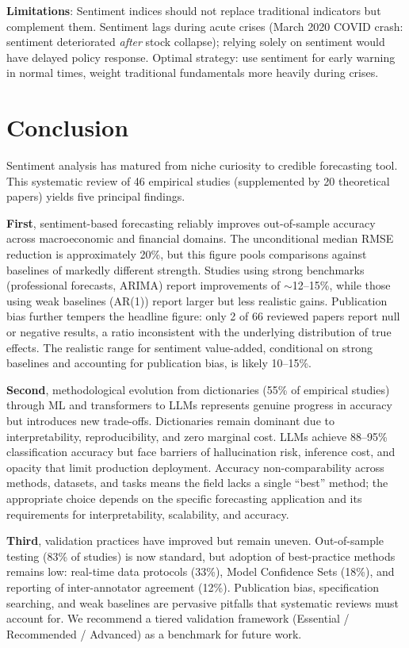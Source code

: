 \documentclass[11pt,twocolumn]{article}
\begin{document}
\textbf{Limitations}: Sentiment indices should not replace traditional indicators but complement them. Sentiment lags during acute crises (March 2020 COVID crash: sentiment deteriorated \emph{after} stock collapse); relying solely on sentiment would have delayed policy response. Optimal strategy: use sentiment for early warning in normal times, weight traditional fundamentals more heavily during crises.

\section{Conclusion}

Sentiment analysis has matured from niche curiosity to credible forecasting tool. This systematic review of 46 empirical studies (supplemented by 20 theoretical papers) yields five principal findings.

\textbf{First}, sentiment-based forecasting reliably improves out-of-sample accuracy across macroeconomic and financial domains. The unconditional median RMSE reduction is approximately 20\%, but this figure pools comparisons against baselines of markedly different strength. Studies using strong benchmarks (professional forecasts, ARIMA) report improvements of $\sim$12--15\%, while those using weak baselines (AR(1)) report larger but less realistic gains. Publication bias further tempers the headline figure: only 2 of 66 reviewed papers report null or negative results, a ratio inconsistent with the underlying distribution of true effects. The realistic range for sentiment value-added, conditional on strong baselines and accounting for publication bias, is likely 10--15\%.

\textbf{Second}, methodological evolution from dictionaries (55\% of empirical studies) through ML and transformers to LLMs represents genuine progress in accuracy but introduces new trade-offs. Dictionaries remain dominant due to interpretability, reproducibility, and zero marginal cost. LLMs achieve 88--95\% classification accuracy but face barriers of hallucination risk, inference cost, and opacity that limit production deployment. Accuracy non-comparability across methods, datasets, and tasks means the field lacks a single ``best'' method; the appropriate choice depends on the specific forecasting application and its requirements for interpretability, scalability, and accuracy.

\textbf{Third}, validation practices have improved but remain uneven. Out-of-sample testing (83\% of studies) is now standard, but adoption of best-practice methods remains low: real-time data protocols (33\%), Model Confidence Sets (18\%), and reporting of inter-annotator agreement (12\%). Publication bias, specification searching, and weak baselines are pervasive pitfalls that systematic reviews must account for. We recommend a tiered validation framework (Essential / Recommended / Advanced) as a benchmark for future work.
\end{document}
